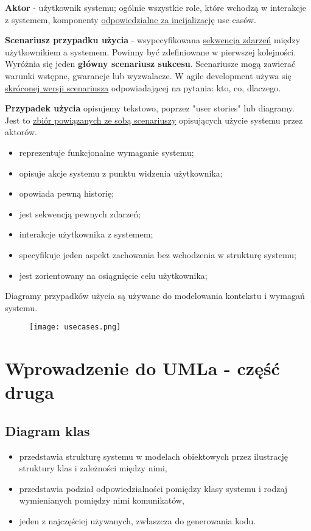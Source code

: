 \documentclass[a4paper]{article}
\begin{document}
\textbf{Aktor} - użytkownik systemu; ogólnie wszystkie role, które wchodzą w interakcje z systemem, komponenty \underline{odpowiedzialne
za incijalizację} use casów.

\textbf{Scenariusz przypadku użycia} - wsypecyfikowana \underline{sekwencja zdarzeń} między użytkownikiem a systemem.
Powinny być zdefiniowane w pierwszej kolejności. Wyróżnia się jeden \textbf{główny scenariusz sukcesu}. Scenariusze mogą zawierać
warunki wstępne, gwarancje lub wyzwalacze. W agile development używa się \underline{skróconej wersji scenariusza} odpowiadającej
na pytania: kto, co, dlaczego.

\textbf{Przypadek użycia} opisujemy tekstowo, poprzez "user stories" lub diagramy. Jest to \underline{zbiór
powiązanych ze sobą scenariuszy}
opisujących użycie systemu przez aktorów.
    \begin{itemize}
        \item reprezentuje funkcjonalne wymaganie systemu;
        \item opisuje akcje systemu z punktu widzenia użytkownika;
        \item opowiada pewną historię;
        \item jest sekwencją pewnych zdarzeń;
        \item interakcje użytkownika z systemem;
        \item specyfikuje jeden aspekt zachowania bez wchodzenia w
strukturę systemu;
        \item jest zorientowany na osiągnięcie celu użytkownika;
    \end{itemize}
Diagramy przypadków użycia są używane do modelowania kontekstu i wymagań systemu.

\begin{figure}[h!]
    \texttt{[image: usecases.png]}
\end{figure}

\section{Wprowadzenie do UMLa - część druga}

\subsection{Diagram klas}
    \begin{itemize}
        \item przedstawia strukturę systemu w modelach obiektowych przez ilustrację
        struktury klas i zależności między nimi,
        \item przedstawia podział odpowiedzialności pomiędzy klasy systemu i
        rodzaj wymienianych pomiędzy nimi komunikatów,
        \item jeden z najczęściej używanych, zwłaszcza do generowania kodu.
    \end{itemize}
\end{document}
